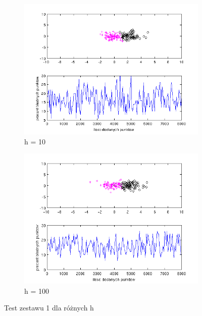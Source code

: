 \documentclass[10pt,a4paper]{article}
\begin{document}
\begin{figure}[H]
   \begin{subfigure}[b]{0.5\textwidth}
    \includegraphics[width=\textwidth]{test3_h10_16_52.png}
    \caption{h = 10}
  \end{subfigure}
  \hfill
    \begin{subfigure}[b]{0.5\textwidth}
    \includegraphics[width=\textwidth]{test3_h100_16_70.png}
    \caption{h = 100}
  \end{subfigure}
  
  
  
  \caption{Test zestawu 1 dla różnych h}
  \label{test_h3}
  
\end{figure}
\end{document}
